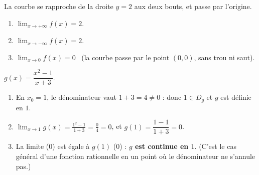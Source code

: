 \documentclass[11pt,a4paper]{article}
\begin{document}
\begin{correction}
La courbe se rapproche de la droite $y=2$ aux deux bouts, et passe par l'origine.
\begin{enumerate}[label=\alph*),leftmargin=2em,itemsep=3pt]
  \item $\displaystyle\lim_{x\to +\infty} f(x)=2$.
  \item $\displaystyle\lim_{x\to -\infty} f(x)=2$.
  \item $\displaystyle\lim_{x\to 0} f(x)=0$ \ (la courbe passe par le point $(0,0)$, sans trou ni saut).
\end{enumerate}
\end{correction}

\begin{correction}
$g(x)=\dfrac{x^2-1}{x+3}$.
\begin{enumerate}[label=\alph*),leftmargin=2em,itemsep=3pt]
  \item En $x_0=1$, le dénominateur vaut $1+3=4\neq 0$ : donc $1\in D_g$ et $g$ est définie en $1$.
  \item $\displaystyle\lim_{x\to 1} g(x)=\frac{1^2-1}{1+3}=\frac{0}{4}=0$, \quad et \quad
        $g(1)=\dfrac{1-1}{1+3}=0$.
  \item La limite ($0$) est égale à $g(1)$ ($0$) : \textbf{$g$ est continue en $1$}. (C'est le cas général
        d'une fonction rationnelle en un point où le dénominateur ne s'annule pas.)
\end{enumerate}
\end{correction}
\end{document}
